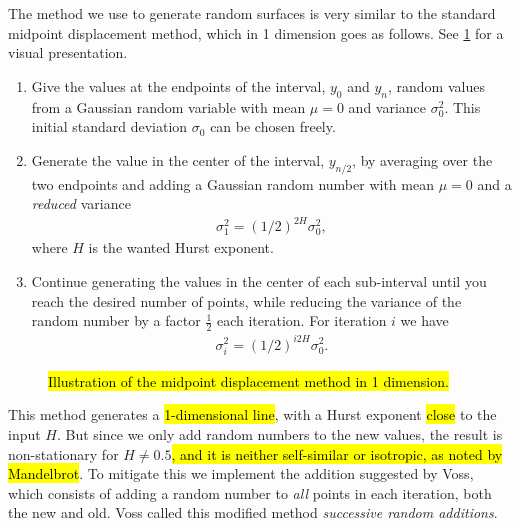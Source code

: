 The method we use to generate random surfaces is very similar to the standard midpoint displacement method, which in 1 dimension goes as follows. See \cref{fig:midpoint01} for a visual presentation.
\begin{enumerate}
    \item Give the values at the endpoints of the interval, $y_0$ and $y_n$, random values from a Gaussian random variable with mean $\mu = 0$ and variance $\sigma_0^2$. This initial standard deviation $\sigma_0$ can be chosen freely.
    \item Generate the value in the center of the interval, $y_{n/2}$, by averaging over the two endpoints and adding a Gaussian random number with mean $\mu = 0$ and a \emph{reduced} variance
    \begin{align}
         \sigma_1^2 = \left(1/2\right)^{2H}\sigma_0^2, \label{eq:midpoint_sigma_first}
    \end{align}
    where $H$ is the wanted Hurst exponent.
    \item Continue generating the values in the center of each sub-interval until you reach the desired number of points, while reducing the variance of the random number by a factor $\frac{1}{2}$ each iteration. For iteration $i$ we have
    \begin{align}
        \sigma_i^2 = \left(1/2\right)^{i2H}\sigma_0^2. \label{eq:midpoint_sigma_general}
    \end{align}
\end{enumerate}

\begin{figure}
    \centering
    
    \caption{
        \hl{Illustration of the midpoint displacement method in 1 dimension.}
        \label{fig:midpoint01}
    }
\end{figure}

This method generates a \hl{1-dimensional line}, with a Hurst exponent \hl{close} to the input $H$. But since we only add random numbers to the new values, the result is non-stationary for $H \neq 0.5$\cite{voss1985random}\hl{, and it is neither self-similar or isotropic, as noted by Mandelbrot}\cite{mandelbrot1982comment}. To mitigate this we implement the addition suggested by Voss\cite{voss1985random}, which consists of adding a random number to \emph{all} points in each iteration, both the new and old. Voss called this modified method \emph{successive random additions}.

